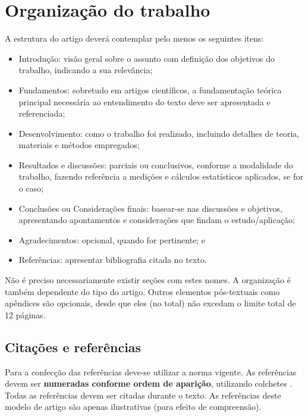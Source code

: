 \documentclass[12pt, a4paper, twoside, twocolumn]{article}
\begin{document}
\section{Organização do trabalho}

A estrutura do artigo deverá contemplar pelo menos os seguintes itens:
%
\begin{itemize}[noitemsep,topsep=0ex] \itemsep=3pt
	\item Introdução: visão geral sobre o assunto com definição dos objetivos do trabalho, indicando a sua relevância;
	\item Fundamentos: sobretudo em artigos científicos, a fundamentação teórica principal necessária ao entendimento do texto deve ser apresentada e referenciada; 
	\item Desenvolvimento: como o trabalho foi realizado, incluindo detalhes de teoria, materiais e métodos empregados;
	\item Resultados e discussões: parciais ou conclusivos, conforme a modalidade do trabalho, fazendo referência a medições e cálculos estatísticos aplicados, se for o caso;
	\item Conclusões ou Considerações finais: basear-se nas discussões e objetivos, apresentando apontamentos e considerações que findam o estudo/aplicação;
	\item Agradecimentos: opcional, quando for pertinente; e
	\item Referências: apresentar bibliografia citada no texto.
\end{itemize}
%
Não é preciso necessariamente existir seções com estes nomes. A organização é também dependente do tipo do artigo.
Outros elementos pós-textuais como apêndices são opcionais, desde que eles (no total) não excedam o limite total de 12 páginas. 

\subsection{Citações e referências}

Para a confecção das referências deve-se utilizar a norma vigente. As referências devem ser \textbf{numeradas conforme ordem de aparição}, utilizando colchetes \cite{Gomes-2015}. Todas as referências devem ser citadas durante o texto. As referências \cite{Mareze-2017,Fonseca-2013,Brandao-2017,Gomes-2015,Oppenheim-2010,Muller-2001,Mareze-2019,Borges-2018,Ristow-2016} deste modelo de artigo são apenas ilustrativas (para efeito de compreensão).
\end{document}
